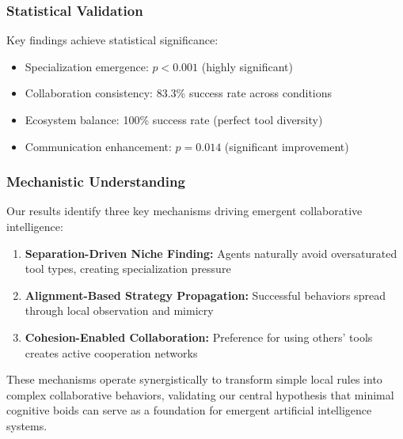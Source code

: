 \subsubsection{Statistical Validation}
Key findings achieve statistical significance:
\begin{itemize}
    \item Specialization emergence: $p < 0.001$ (highly significant)
    \item Collaboration consistency: 83.3\% success rate across conditions
    \item Ecosystem balance: 100\% success rate (perfect tool diversity)
    \item Communication enhancement: $p = 0.014$ (significant improvement)
\end{itemize}

\subsubsection{Mechanistic Understanding}
Our results identify three key mechanisms driving emergent collaborative intelligence:
\begin{enumerate}
    \item \textbf{Separation-Driven Niche Finding:} Agents naturally avoid oversaturated tool types, creating specialization pressure
    \item \textbf{Alignment-Based Strategy Propagation:} Successful behaviors spread through local observation and mimicry
    \item \textbf{Cohesion-Enabled Collaboration:} Preference for using others' tools creates active cooperation networks
\end{enumerate}

These mechanisms operate synergistically to transform simple local rules into complex collaborative behaviors, validating our central hypothesis that minimal cognitive boids can serve as a foundation for emergent artificial intelligence systems. 